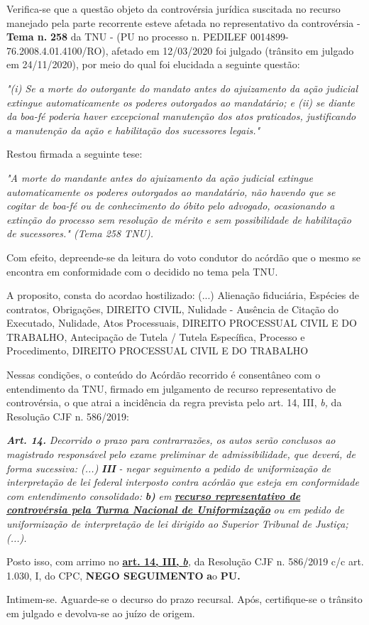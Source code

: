 \documentclass[12pt]{article}
\begin{document}
\justifying
\noindent Verifica-se que a questão objeto da controvérsia jurídica suscitada no recurso manejado pela parte recorrente esteve afetada no representativo da controvérsia - \textbf{Tema n. }\textbf{258} da TNU - (PU no processo n. PEDILEF 0014899-76.2008.4.01.4100/RO),  afetado em 12/03/2020 foi julgado (trânsito em julgado em 24/11/2020), por meio do qual foi elucidada a seguinte questão:

\noindent \textit{"(i) Se a morte do outorgante do mandato antes do ajuizamento da ação judicial extingue automaticamente os poderes outorgados ao mandatário; e (ii) se diante da boa-fé poderia haver excepcional manutenção dos atos praticados, justificando a manutenção da ação e habilitação dos sucessores legais."}

\noindent Restou firmada a seguinte tese:

\noindent \textit{"A morte do mandante antes do ajuizamento da ação judicial extingue automaticamente os poderes outorgados ao mandatário, não havendo que se cogitar de boa-fé ou de conhecimento do óbito pelo advogado, ocasionando a extinção do processo sem resolução de mérito e sem possibilidade de habilitação de sucessores." (Tema 258 TNU).}

\noindent Com efeito, depreende-se da leitura do voto condutor do acórdão que o mesmo se encontra em conformidade com o decidido no  tema pela TNU.

\noindent A proposito, consta do acordao hostilizado: (...) Alienação fiduciária, Espécies de contratos, Obrigações, DIREITO CIVIL, Nulidade - Ausência de Citação do Executado, Nulidade, Atos Processuais, DIREITO PROCESSUAL CIVIL E DO TRABALHO, Antecipação de Tutela / Tutela Específica, Processo e Procedimento, DIREITO PROCESSUAL CIVIL E DO TRABALHO

\noindent Nessas condições, o conteúdo do Acórdão recorrido é consentâneo com o entendimento da TNU, firmado em julgamento de recurso representativo de controvérsia, o que atrai a incidência da regra prevista pelo art. 14, III, \textit{b,} da Resolução CJF n. 586/2019:

\noindent \textit{\textbf{Art. 14.}}\textit{ Decorrido o prazo para contrarrazões, os autos serão conclusos ao magistrado responsável pelo exame preliminar de admissibilidade, que deverá, de forma sucessiva: (...) }\textit{\textbf{III }}\textit{- negar seguimento a pedido de uniformização de interpretação de lei federal interposto contra acórdão que esteja em conformidade com entendimento consolidado: }\textit{\textbf{b)}}\textit{ em }\uline{\textit{\textbf{recurso representativo de controvérsia pela Turma Nacional de Uniformização}}}\textit{ ou em pedido de uniformização de interpretação de lei dirigido ao Superior Tribunal de Justiça;(...).}

\noindent Posto isso, com arrimo no \uline{\textbf{art. 14, III, }}\uline{\textit{\textbf{b}}}\textit{,} da Resolução CJF n. 586/2019 c/c art. 1.030, I, do CPC, \textbf{NEGO SEGUIMENTO }\textbf{a}o\textbf{ PU}\textbf{.}

\noindent Intimem-se. Aguarde-se o decurso do prazo recursal. Após, certifique-se o trânsito em julgado e devolva-se ao juízo de origem.
\end{document}
